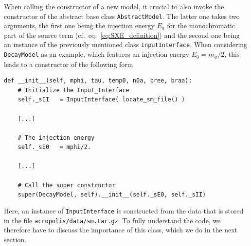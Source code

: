\documentclass[11pt,a4paper]{article}
\begin{document}
When calling the constructor of a new model, it crucial to also invoke the constructor of the abstract base class \texttt{AbstractModel}. The latter one takes two arguments, the first one being the injection energy $E_0$ for the monochromatic part of the source term (cf.\ eq.~\eqref{eq:SXE_definition}) and the second one being an instance of the previously mentioned class \texttt{InputInterface}. When considering \texttt{DecayModel} as an example, which features an injection energy $E_0 = m_\phi/2$, this leads to a constructor of the following form
\begin{lstlisting}
def __init__(self, mphi, tau, temp0, n0a, bree, braa):
	# Initialize the Input_Interface
	self._sII   = InputInterface( locate_sm_file() )

	[...]

	# The injection energy
	self._sE0   = mphi/2.

	[...]

	# Call the super constructor
	super(DecayModel, self).__init__(self._sE0, self._sII)
\end{lstlisting}
Here, an instance of \texttt{InputInterface} is constructed from the data that is stored in the file \texttt{acropolis/data/sm.tar.gz}. To fully understand the code, we therefore have to discuss the importance of this class, which we do in the next section.
\end{document}
